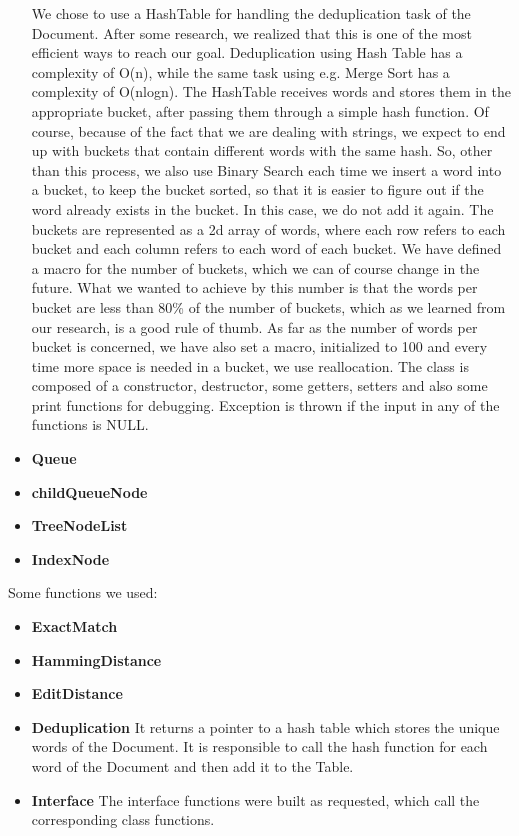 \documentclass{article}
\begin{document}
\begin{itemize}
  We chose to use a HashTable for handling the deduplication task of the Document. After some research, we realized that this is one of the most efficient ways to reach our goal.
  Deduplication using Hash Table has a complexity of O(n), while the same task using e.g. Merge Sort has a complexity of O(nlogn). The HashTable receives words and stores them in the appropriate bucket, after passing them through a simple hash function. Of course, because of the fact that we are dealing with strings, we expect to end up with buckets that contain different words with the same hash. So, other than this process, we also use Binary Search each time we insert a word into a bucket, to keep the bucket sorted, so that it is easier to figure out if the word already exists in the bucket. In this case, we do not add it again.
  The buckets are represented as a 2d array of words, where each row refers to each bucket and each column refers to each word of each bucket. We have defined a macro for the number of buckets, which we can of course change in the future. What we wanted to achieve by this number is that the words per bucket are less than 80\%  of the number of buckets, which as we learned from our research, is a good rule of thumb. As far as the number of words per bucket is concerned, we have also set a macro, initialized to 100 and every time more space is needed in a bucket, we use reallocation. The class is composed of a constructor, destructor, some getters, setters and also some print functions for debugging. Exception is thrown if the input in any of the functions is NULL.
  \item \textbf{Queue}
  \item \textbf{childQueueNode}
  \item \textbf{TreeNodeList}
  \item \textbf{IndexNode}
\end{itemize}
Some functions we used:
\begin{itemize}
  \item \textbf{ExactMatch}
  \item \textbf{HammingDistance}
  \item \textbf{EditDistance}
  \item \textbf{Deduplication} It returns a pointer to a hash table which stores the unique words of the Document. It is responsible to call the hash function for each word of the Document and then add it to the Table.
  \item \textbf{Interface} The interface functions were built as requested, which call the corresponding class functions.
\end{itemize}
\end{document}
